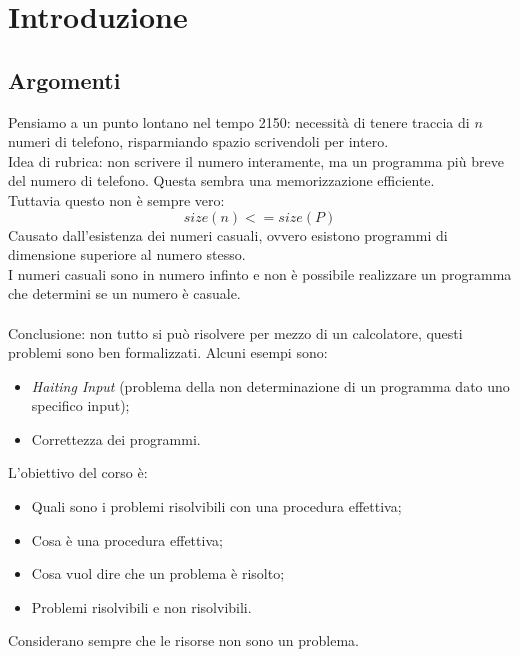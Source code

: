 \documentclass[10pt,a4paper]{book}
\begin{document}
\chapter{Introduzione}
\section{Argomenti}
Pensiamo a un punto lontano nel tempo 2150: necessit\`a di tenere traccia di $n$ numeri di telefono, risparmiando spazio scrivendoli per intero.\\
Idea di rubrica: non scrivere il numero interamente, ma un programma pi\`u breve del numero di telefono. Questa sembra una memorizzazione efficiente.\\
Tuttavia questo non \`e sempre vero:
\begin{equation}size(n) <= size(P)\end{equation}
Causato dall'esistenza dei numeri casuali, ovvero esistono programmi di dimensione superiore al numero stesso.\\
I numeri casuali sono in numero infinto e non \`e possibile realizzare un programma che determini se un numero \`e casuale.\\\\
Conclusione: non tutto si pu\`o risolvere per mezzo di un calcolatore, questi problemi sono ben formalizzati. Alcuni esempi sono:
\begin{itemize}
\item \textit{Haiting Input} (problema della non determinazione di un programma dato uno specifico input);
\item Correttezza dei programmi.
\end{itemize}
L'obiettivo del corso \`e:
\begin{itemize}
\item Quali sono i problemi risolvibili con una procedura effettiva;
\item Cosa \`e una procedura effettiva;
\item Cosa vuol dire che un problema \`e risolto;
\item Problemi risolvibili e non risolvibili.
\end{itemize}
\noindent
Considerano sempre che le risorse non sono un problema.
\end{document}

